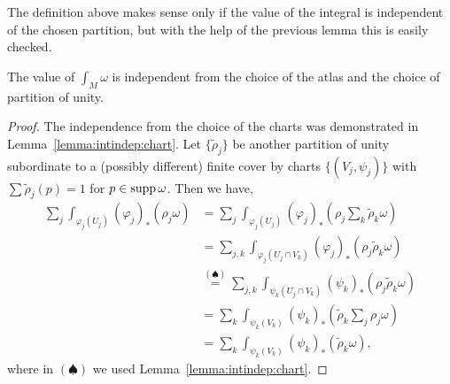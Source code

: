 The definition above makes sense only if the value of the integral is independent of the chosen partition, but with the help of the previous lemma this is easily checked.

\begin{lemma}\label{lemma:intinman}
  The value of $\int_M\omega$ is independent from the choice of the atlas and the choice of partition of unity.
\end{lemma}
\begin{proof}
  The independence from the choice of the charts was demonstrated in Lemma~\ref{lemma:intindep:chart}.
  Let $\{\widetilde\rho_j\}$ be another partition of unity subordinate to a (possibly different) finite cover by charts $\{(V_j, \psi_j)\}$ with $\sum \widetilde\rho_j(p) = 1$ for $p\in\operatorname{supp}\omega$.
  Then we have,
  \begin{align}
    \sum_j \int_{\varphi_j(U_j)} (\varphi_j)_*\left(\rho_j \omega\right)
     & = \sum_j \int_{\varphi_j(U_j)} (\varphi_j)_*\left(\rho_j \sum_k \widetilde\rho_k\omega\right)                         \\
     & = \sum_{j,k} \int_{\varphi_j(U_j\cap V_k)} (\varphi_j)_* \left(\rho_j \widetilde\rho_k\omega\right)                   \\
     & \overset{(\spadesuit)}{=} \sum_{j,k} \int_{\psi_k(U_j\cap V_k)} (\psi_k)_* \left(\rho_j \widetilde\rho_k\omega\right) \\
     & = \sum_k \int_{\psi_k(V_k)} (\psi_k)_*\left(\widetilde\rho_k \sum_j\rho_j \omega\right)                               \\
     & = \sum_k \int_{\psi_k(V_k)} (\psi_k)_*\left( \widetilde\rho_k \omega\right),
  \end{align}
  where in $(\spadesuit)$ we used Lemma~\ref{lemma:intindep:chart}.
\end{proof}

